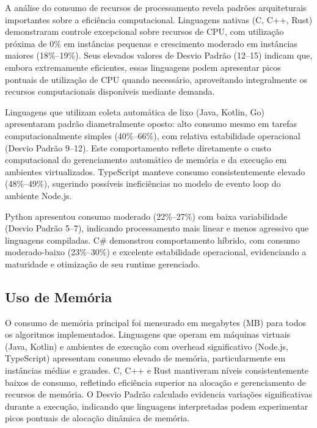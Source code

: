 \documentclass[12pt,a4paper]{article}
\begin{document}
A análise do consumo de recursos de processamento revela padrões arquiteturais importantes sobre a eficiência computacional. Linguagens nativas (C, C++, Rust) demonstraram controle excepcional sobre recursos de CPU, com utilização próxima de 0\% em instâncias pequenas e crescimento moderado em instâncias maiores (18\%--19\%). Seus elevados valores de Desvio Padrão (12--15) indicam que, embora extremamente eficientes, essas linguagens podem apresentar picos pontuais de utilização de CPU quando necessário, aproveitando integralmente os recursos computacionais disponíveis mediante demanda.

Linguagens que utilizam coleta automática de lixo (Java, Kotlin, Go) apresentaram padrão diametralmente oposto: alto consumo mesmo em tarefas computacionalmente simples (40\%--66\%), com relativa estabilidade operacional (Desvio Padrão 9--12). Este comportamento reflete diretamente o custo computacional do gerenciamento automático de memória e da execução em ambientes virtualizados. TypeScript manteve consumo consistentemente elevado (48\%--49\%), sugerindo possíveis ineficiências no modelo de evento loop do ambiente Node.js.

Python apresentou consumo moderado (22\%--27\%) com baixa variabilidade (Desvio Padrão 5--7), indicando processamento mais linear e menos agressivo que linguagens compiladas. C\# demonstrou comportamento híbrido, com consumo moderado-baixo (23\%--30\%) e excelente estabilidade operacional, evidenciando a maturidade e otimização de seu runtime gerenciado.

\subsection{Uso de Memória}

O consumo de memória principal foi mensurado em megabytes (MB) para todos os algoritmos implementados. Linguagens que operam em máquinas virtuais (Java, Kotlin) e ambientes de execução com overhead significativo (Node.js, TypeScript) apresentam consumo elevado de memória, particularmente em instâncias médias e grandes. C, C++ e Rust mantiveram níveis consistentemente baixos de consumo, refletindo eficiência superior na alocação e gerenciamento de recursos de memória. O Desvio Padrão calculado evidencia variações significativas durante a execução, indicando que linguagens interpretadas podem experimentar picos pontuais de alocação dinâmica de memória.
\end{document}
